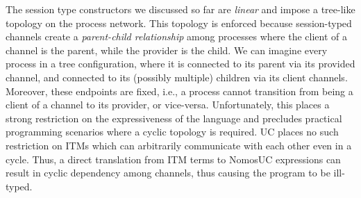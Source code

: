 The session type constructors we discussed so far are \emph{linear} and impose a tree-like topology
on the process network.
This topology is enforced because session-typed channels create a \emph{parent-child relationship} among processes
where the client of a channel is the parent, while the provider is the child.
We can imagine every process in a tree configuration, where it is connected to its parent via its provided channel,
and connected to its (possibly multiple) children via its client channels.
Moreover, these endpoints are fixed, i.e., a process cannot transition from being a client of
a channel to its provider, or vice-versa.
Unfortunately, this places a strong restriction on the expressiveness of the language and precludes practical
programming scenarios where a cyclic topology is required.
UC places no such restriction on ITMs which can arbitrarily communicate with each other even in a cycle.
Thus, a direct translation from ITM terms to NomosUC expressions can result in cyclic
dependency among channels, thus causing the program to be ill-typed.

